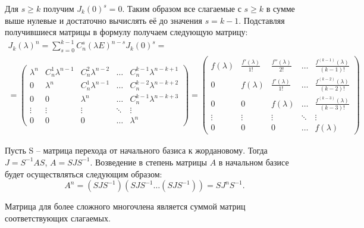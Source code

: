 \begin{algorithm}
    Для $s \geq k$ получим $J_k(0)^s = 0$. Таким образом все слагаемые с $s \geq k$ в сумме выше 
    нулевые и достаточно вычислять её до значения $s = k-1$. Подставляя получившиеся матрицы 
    в формулу получаем следующую матрицу:
    \begin{gather*}
        J_k(\lambda)^n = \displaystyle\sum_{s = 0}^{k-1} C_n^s 
        (\lambda E)^{n-s} J_k(0)^s = \\ = \begin{pmatrix}
            \lambda^n & C_n^1 \lambda^{n-1}  & C_n^2 \lambda^{n-2}  & \dots  & C_n^{k-1} \lambda^{n-k+1} \\
            0         & \lambda^n            & C_n^1 \lambda^{n-1}  & \dots  & C_n^{k-2} \lambda^{n-k+2} \\
            0         & 0                    & \lambda^n            & \dots  & C_n^{k-1} \lambda^{n-k+3} \\
            \vdots    & \vdots               & \vdots               & \ddots & \vdots                    \\
            0         & 0                    & 0                    & \dots  & \lambda^n
        \end{pmatrix} = \begin{pmatrix}
            f(\lambda)  & \frac{f'(\lambda)}{1!} & \frac{f''(\lambda)}{2!}  & \dots  & \frac{f^{(k-1)}(\lambda)}{(k-1)!} \\
            0           & f(\lambda)             & \frac{f'(\lambda)}{1!}   & \dots  & \frac{f^{(k-2)}(\lambda)}{(k-2)!} \\
            0           & 0                      & f(\lambda)               & \dots  & \frac{f^{(k-3)}(\lambda)}{(k-3)!} \\
            \vdots      & \vdots                 & \vdots                   & \ddots & \vdots                            \\
            0           & 0                      & 0                        & \dots  & f(\lambda)
        \end{pmatrix}
    \end{gather*}

    Пусть S -- матрица перехода от начального базиса к жордановому. Тогда $J = S^{-1} A S$, 
    $A = S J S^{-1}$. Возведение в степень матрицы $A$ в начальном базисе будет осуществляться 
    следующим образом: $$A^n = (S J S^{-1}) (S J S^{-1} \dots (S J S^{-1})) = S J^n S^{-1}.$$
    
    Матрица для более сложного многочлена является суммой матриц соответствующих слагаемых.
\end{algorithm}

